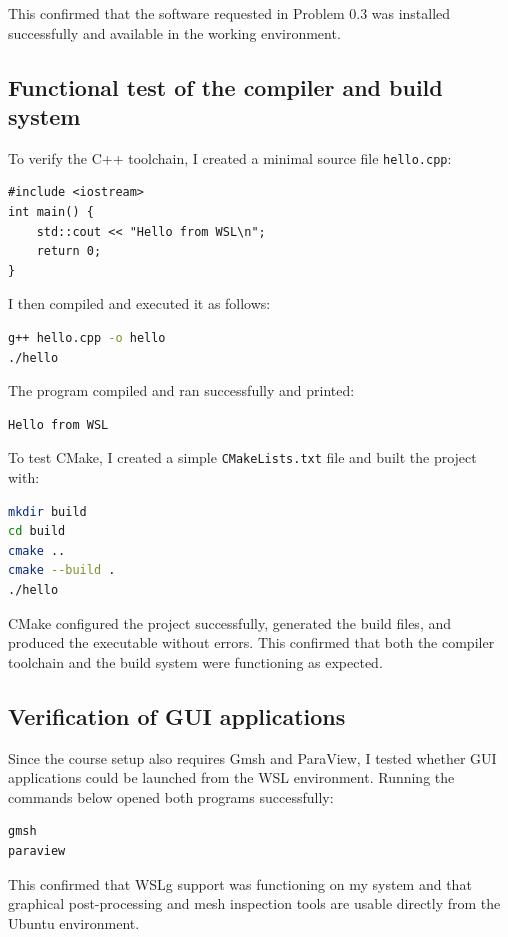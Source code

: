 \documentclass[11pt,a4paper]{article}
\begin{document}
This confirmed that the software requested in Problem 0.3 was installed successfully and available in the working environment.

\subsection{Functional test of the compiler and build system}
To verify the C++ toolchain, I created a minimal source file \texttt{hello.cpp}:

\begin{lstlisting}
#include <iostream>
int main() {
    std::cout << "Hello from WSL\n";
    return 0;
}
\end{lstlisting}

I then compiled and executed it as follows:

\begin{lstlisting}[language=bash]
g++ hello.cpp -o hello
./hello
\end{lstlisting}

The program compiled and ran successfully and printed:

\begin{lstlisting}
Hello from WSL
\end{lstlisting}

To test CMake, I created a simple \texttt{CMakeLists.txt} file and built the project with:

\begin{lstlisting}[language=bash]
mkdir build
cd build
cmake ..
cmake --build .
./hello
\end{lstlisting}

CMake configured the project successfully, generated the build files, and produced the executable without errors. This confirmed that both the compiler toolchain and the build system were functioning as expected.

\subsection{Verification of GUI applications}
Since the course setup also requires Gmsh and ParaView, I tested whether GUI applications could be launched from the WSL environment. Running the commands below opened both programs successfully:

\begin{lstlisting}[language=bash]
gmsh
paraview
\end{lstlisting}

This confirmed that WSLg support was functioning on my system and that graphical post-processing and mesh inspection tools are usable directly from the Ubuntu environment.
\end{document}
